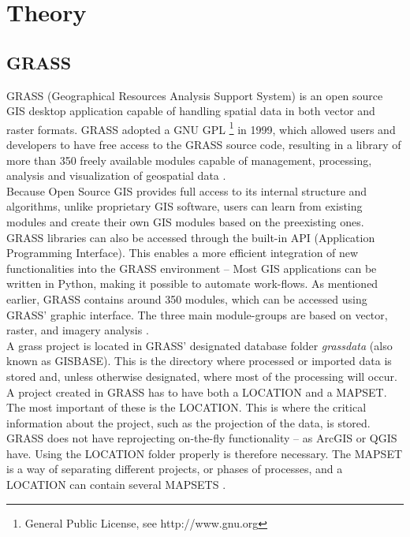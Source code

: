 \chapter{Theory} %

\label{ch:theory} %


\section{GRASS}
GRASS (Geographical Resources Analysis Support System) is an open source GIS desktop application capable of handling spatial data in both vector and raster formats. 
GRASS adopted a GNU GPL \footnote{General Public License, see http://www.gnu.org} in 1999, which allowed users and developers to have free access to the GRASS source code, resulting in a library of more than 350 freely available modules capable of management, processing, analysis and visualization of geospatial data \citep{GRASSGIS}.\\
Because Open Source GIS provides full access to its internal structure and algorithms, unlike proprietary GIS software, users can learn from existing modules and create their own GIS modules based on the preexisting ones. GRASS libraries can also be accessed through the built-in API (Application Programming Interface). This enables a more efficient integration of new functionalities into the GRASS environment – Most GIS applications can be written in Python, making it possible to automate work-flows.
As mentioned earlier, GRASS contains around 350 modules, which can be accessed using GRASS' graphic interface. The three main module-groups are based on vector, raster, and imagery analysis \citep{grassbook}.\\

A grass project is located in GRASS' designated database folder \textit{grassdata} (also known as GISBASE). This is the directory where processed or imported data is stored and, unless otherwise designated, where most of the processing will occur. 
A project created in GRASS has to have both a \textsc{LOCATION} and a \textsc{MAPSET}.
The most important of these is the \textsc{LOCATION}. This is where the critical information about the project, such as the projection of the data, is stored. 
GRASS does not have reprojecting on-the-fly functionality – as ArcGIS or QGIS have. Using the \textsc{LOCATION} folder properly is therefore necessary. 
The \textsc{MAPSET} is a way of separating different projects, or phases of processes, and a LOCATION can contain several \textsc{MAPSETS} \citep{grassbook}. 


